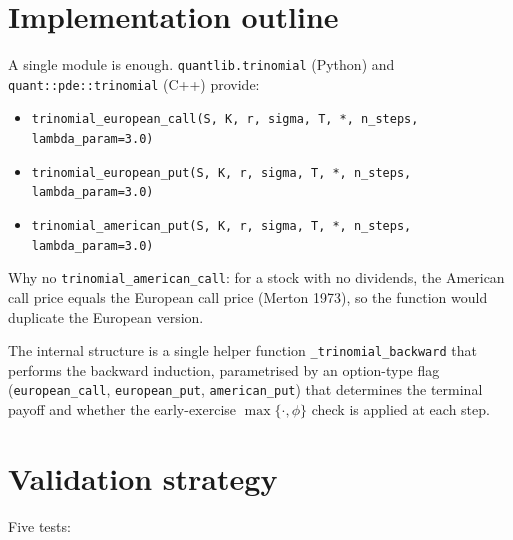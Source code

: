 \documentclass[11pt,a4paper]{article}
\begin{document}
\section{Implementation outline}

A single module is enough. \texttt{quantlib.trinomial} (Python) and
\texttt{quant::pde::trinomial} (C++) provide:

\begin{itemize}[leftmargin=2em]
\item \texttt{trinomial\_european\_call(S, K, r, sigma, T, *, n\_steps, lambda\_param=3.0)}
\item \texttt{trinomial\_european\_put(S, K, r, sigma, T, *, n\_steps, lambda\_param=3.0)}
\item \texttt{trinomial\_american\_put(S, K, r, sigma, T, *, n\_steps, lambda\_param=3.0)}
\end{itemize}

Why no \texttt{trinomial\_american\_call}: for a stock with no
dividends, the American call price equals the European call price
(Merton 1973), so the function would duplicate the European version.

The internal structure is a single helper function \texttt{\_trinomial\_backward}
that performs the backward induction, parametrised by an option-type
flag (\texttt{european\_call}, \texttt{european\_put}, \texttt{american\_put})
that determines the terminal payoff and whether the early-exercise
$\max\{\cdot, \phi\}$ check is applied at each step.

\section{Validation strategy}

Five tests:
\end{document}

